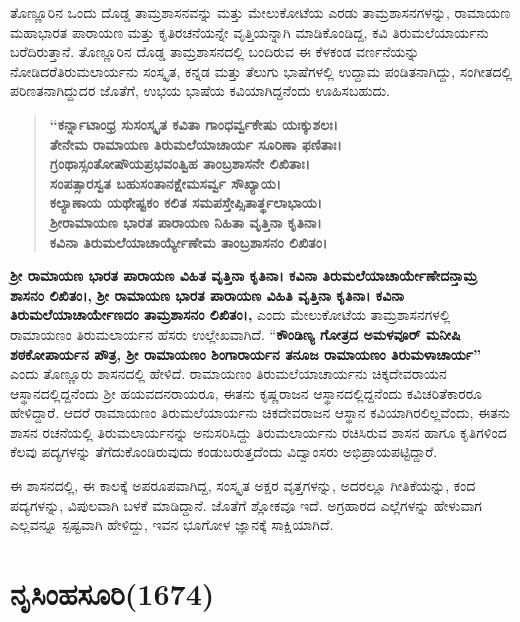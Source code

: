 ತೊಣ್ಣೂರಿನ ಒಂದು ದೊಡ್ಡ ತಾಮ್ರಶಾಸನವನ್ನು ಮತ್ತು ಮೇಲುಕೋಟೆಯ ಎರಡು ತಾಮ್ರಶಾಸನಗಳನ್ನು, ರಾಮಾಯಣ ಮಹಾಭಾರತ ಪಾರಾಯಣ ಮತ್ತು ಕೃತಿರಚನೆಯನ್ನೇ ವೃತ್ತಿಯನ್ನಾಗಿ ಮಾಡಿಕೊಂಡಿದ್ದ, ಕವಿ ತಿರುಮಲೆಯಾರ್ಯನು ಬರೆದಿರುತ್ತಾನೆ. ತೊಣ್ಣೂರಿನ ದೊಡ್ಡ ತಾಮ್ರಶಾಸನದಲ್ಲಿ ಬಂದಿರುವ ಈ ಕೆಳಕಂಡ ವರ್ಣನೆಯನ್ನು ನೋಡಿದರೆ\break ತಿರುಮಲಾರ್ಯನು ಸಂಸ್ಕೃತ, ಕನ್ನಡ ಮತ್ತು ತೆಲುಗು ಭಾಷೆಗಳಲ್ಲಿ ಉದ್ದಾಮ ಪಂಡಿತನಾಗಿದ್ದು, ಸಂಗೀತದಲ್ಲಿ ಪರಿಣತ\-ನಾಗಿದ್ದುದರ ಜೊತೆಗೆ, ಉಭಯ ಭಾಷೆಯ ಕವಿಯಾಗಿದ್ದನೆಂದು ಊಹಿಸಬಹುದು.

\begin{verse}
\textbf{“ಕರ್ನ್ನಾಟಾಂಧ್ರ ಸುಸಂಸ್ಕೃತ ಕವಿತಾ ಗಾಂಧರ್ವ್ವಕೇಷು ಯಃಕ್ಕುಶಲಃ। } \\\textbf{ತೇನೇಮ ರಾಮಾಯಣ ತಿರುಮಲೆಯಾಚಾರ್ಯ ಸೂರಿಣಾ ಫಣಿತಾಃ।} \\\textbf{ಗ್ರಂಥಾಸ್ಸಂತೋಷೌಯಪ್ರಭವಂತ್ವಿಹ ತಾಂಬ್ರಶಾಸನೇ ಲಿಖಿತಾಃ।} \\\textbf{ಸಂಪತ್ಸಾರಸ್ವತ ಬಹುಸಂತಾನಕ್ಷೇಮಸರ್ವ್ವ ಸೌಖ್ಯಾಯ।} \\\textbf{ಕಲ್ಯಾಣಾಯ ಯಥೇಷ್ಟಕಂ ಕಲಿತ ಸಮಪಸ್ತೇಪ್ಸಿತಾರ್ತ್ಥಲಾಭಾಯ।} \\\textbf{ಶ‍್ರೀರಾಮಾಯಣ ಭಾರತ ಪಾರಾಯಣ ನಿಹಿತಾ ವೃತ್ತಿನಾ ಕೃತಿನಾ।} \\\textbf{ಕವಿನಾ ತಿರುಮಲೆಯಾಚಾರ್ಯ್ಯೇಣೇಮ ತಾಂಬ್ರಶಾಸನಂ ಲಿಖಿತಂ।}
\end{verse}

\textbf{ಶ‍್ರೀ ರಾಮಾಯಣ ಭಾರತ ಪಾರಾಯಣ ವಿಹಿತ ವೃತ್ತಿನಾ ಕೃತಿನಾ। ಕವಿನಾ ತಿರುಮಲೆಯಾಚಾರ್ಯೇಣೇದನ್ತಾಮ್ರ ಶಾಸನಂ ಲಿಖಿತಂ।,}\textbf{ ಶ‍್ರೀ ರಾಮಾಯಣ ಭಾರತ ಪಾರಾಯಣ ವಿಹಿತಿ ವೃತ್ತಿನಾ ಕೃತಿನಾ। ಕವಿನಾ ತಿರುಮಲೆಯಾಚಾರ್ಯೇಣದಂ ತಾಮ್ರಶಾಸನಂ ಲಿಖಿತಂ।,} ಎಂದು ಮೇಲುಕೋಟೆಯ ತಾಮ್ರಶಾಸನಗಳಲ್ಲಿ ರಾಮಾಯಣಂ ತಿರುಮಲಾರ್ಯನ ಹೆಸರು ಉಲ್ಲೇಖವಾಗಿದೆ. “\textbf{ಕೌಂಡಿಣ್ಯ ಗೋತ್ರದ ಅಮಳವೂರ್​ ಮನೀಷಿ ಶಠಕೋಪಾರ್ಯನ ಪೌತ್ರ, ಶ‍್ರೀ ರಾಮಾಯಣಂ ಶಿಂಗಾರಾರ್ಯನ ತನೂಜ ರಾಮಾಯಣಂ ತಿರುಮಳಾಚಾರ್ಯ”} ಎಂದು ತೊಣ್ಣೂರು ಶಾಸನದಲ್ಲಿ ಹೇಳಿದೆ. ರಾಮಾಯಣಂ ತಿರುಮಲೆಯಾಚಾರ್ಯನು ಚಿಕ್ಕದೇವರಾಯನ ಆಸ್ಥಾನದಲ್ಲಿದ್ದನೆಂದು ಶ‍್ರೀ ಹಯವದನರಾಯರೂ, ಈತನು ಕೃಷ್ಣರಾಜನ ಆಸ್ಥಾನದಲ್ಲಿದ್ದನೆಂದು ಕವಿಚರಿತೆಕಾರರೂ ಹೇಳಿದ್ದಾರೆ. ಆದರೆ ರಾಮಾಯಣಂ ತಿರುಮಲೆಯಾರ್ಯನು ಚಿಕದೇವರಾಜನ ಆಸ್ಥಾನ ಕವಿಯಾಗಿರಲಿಲ್ಲವೆಂದು, ಈತನು ಶಾಸನ ರಚನೆಯಲ್ಲಿ ತಿರುಮಲಾರ್ಯನನ್ನು ಅನುಸರಿಸಿದ್ದು ತಿರುಮಲಾರ್ಯನು ರಚಿಸಿರುವ ಶಾಸನ ಹಾಗೂ ಕೃತಿಗಳಿಂದ ಕೆಲವು ಪದ್ಯಗಳನ್ನು ತೆಗೆದುಕೊಂಡಿರುವುದು ಕಂಡುಬರುತ್ತದೆಂದು ವಿದ್ವಾಂಸರು ಅಭಿಪ್ರಾಯಪಟ್ಟಿದ್ದಾರೆ.

ಈ ಶಾಸನದಲ್ಲಿ, ಈ ಕಾಲಕ್ಕೆ ಅಪರೂಪವಾಗಿದ್ದ, ಸಂಸ್ಕೃತ ಅಕ್ಷರ ವೃತ್ತಗಳನ್ನು, ಅದರಲ್ಲೂ ಗೀತಿಕೆಯನ್ನು, ಕಂದ ಪದ್ಯಗಳನ್ನು, ವಿಪುಲವಾಗಿ ಬಳಕೆ ಮಾಡಿದ್ದಾನೆ. ಜೊತೆಗೆ ಶ್ಲೋಕವೂ ಇದೆ. ಅಗ್ರಹಾರದ ಎಲ್ಲೆಗಳನ್ನು ಹೇಳುವಾಗ ಎಲ್ಲವನ್ನೂ ಸ್ಪಷ್ಟವಾಗಿ ಹೇಳಿದ್ದು, ಇವನ ಭೂಗೋಳ ಜ್ಞಾನಕ್ಕೆ ಸಾಕ್ಷಿಯಾಗಿದೆ.


\section{ನೃಸಿಂಹಸೂರಿ(1674)}

